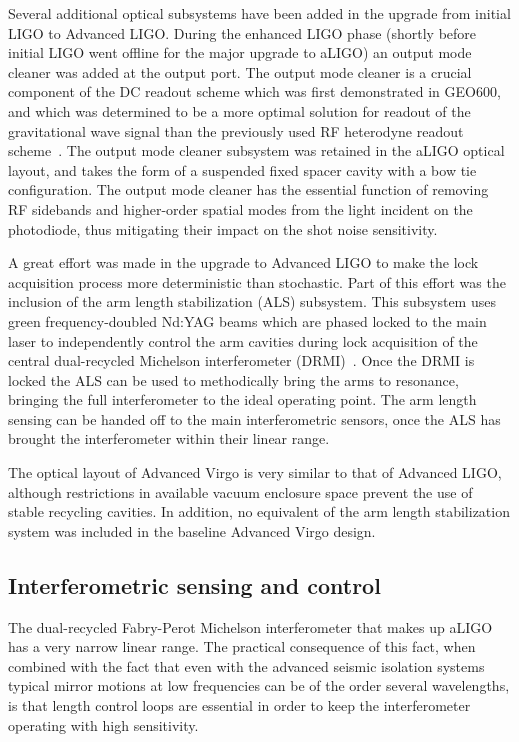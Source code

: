 Several additional optical subsystems have been added in the upgrade from initial LIGO to Advanced LIGO. 
During the enhanced LIGO phase (shortly before initial LIGO went offline for the major upgrade to aLIGO) an output
mode cleaner was added at the output port. The output mode cleaner is a crucial component of the DC readout 
scheme which was first demonstrated in GEO600, and which was determined to be a more optimal solution for 
readout of the gravitational wave signal than the previously used RF heterodyne readout scheme~\cite{DCreadout}. The output mode cleaner subsystem was retained in the aLIGO optical layout, and takes the form of a suspended fixed spacer cavity with a bow tie configuration.
The output mode cleaner has the essential function of removing RF sidebands and higher-order spatial modes from the light incident on the photodiode, thus mitigating their impact on the shot noise sensitivity. 

A great effort was made in the upgrade to Advanced LIGO to make the lock acquisition process more deterministic than stochastic.
Part of this effort was the inclusion of the arm length stabilization (ALS) subsystem.
This subsystem uses green frequency-doubled Nd:YAG beams which are phased locked to the main laser to independently control the arm cavities during lock acquisition of the central dual-recycled Michelson interferometer (DRMI)~\cite{Staley2014}.
Once the DRMI is locked the ALS can be used to methodically bring the arms to resonance, bringing the full interferometer to the ideal operating point. 
The arm length sensing can be handed off to the main interferometric sensors, once the ALS has brought the interferometer within their linear range.

The optical layout of Advanced Virgo is very similar to that of Advanced LIGO, although restrictions in available vacuum enclosure space prevent the use of stable recycling cavities. In addition, no equivalent of the arm length stabilization system was included in the baseline Advanced Virgo design.

\subsection{Interferometric sensing and control}
The dual-recycled Fabry-Perot Michelson interferometer that makes up aLIGO has a very narrow linear range. 
The practical consequence of this fact, when combined with the fact that even with the advanced seismic isolation systems typical 
mirror motions at low frequencies can be of the order several wavelengths, is that length control loops are essential in order 
to keep the interferometer operating with high sensitivity. 

